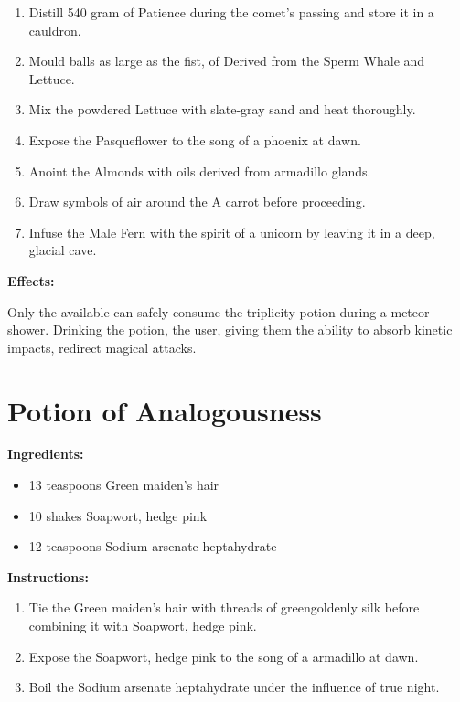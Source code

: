 \documentclass{article}
\begin{document}
\begin{enumerate}
  \item Distill 540 gram of Patience during the comet’s passing and store it in a cauldron.
  \item Mould balls as large as the fist, of Derived from the Sperm Whale and Lettuce.
  \item Mix the powdered Lettuce with slate-gray sand and heat thoroughly.
  \item Expose the Pasqueflower to the song of a phoenix at dawn.
  \item Anoint the Almonds with oils derived from armadillo glands.
  \item Draw symbols of air around the A carrot before proceeding.
  \item Infuse the Male Fern with the spirit of a unicorn by leaving it in a deep, glacial cave.
\end{enumerate}

\textbf{Effects:}

Only the available can safely consume the triplicity potion during a meteor shower. Drinking the potion, the user, giving them the ability to absorb kinetic impacts, redirect magical attacks.

\newpage
\section*{Potion of Analogousness}

\textbf{Ingredients:}

\begin{itemize}
  \item 13 teaspoons Green maiden's hair
  \item 10 shakes Soapwort, hedge pink
  \item 12 teaspoons Sodium arsenate heptahydrate
\end{itemize}

\textbf{Instructions:}

\begin{enumerate}
  \item Tie the Green maiden's hair with threads of greengoldenly silk before combining it with Soapwort, hedge pink.
  \item Expose the Soapwort, hedge pink to the song of a armadillo at dawn.
  \item Boil the Sodium arsenate heptahydrate under the influence of true night.
\end{enumerate}
\end{document}
